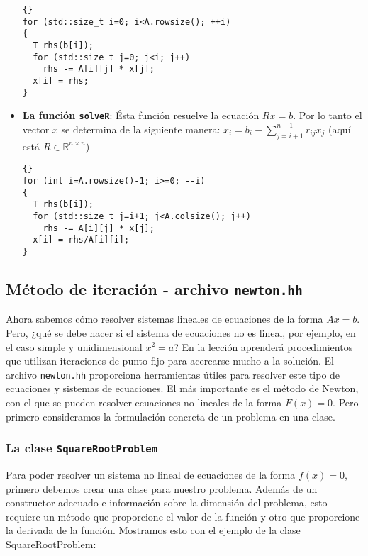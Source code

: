 \documentclass[a4paper,11pt]{article}
\theoremstyle{definition}
\begin{document}
\begin{itemize}
{\footnotesize{\begin{lstlisting}{}
for (std::size_t i=0; i<A.rowsize(); ++i)
{
  T rhs(b[i]);
  for (std::size_t j=0; j<i; j++)
    rhs -= A[i][j] * x[j];
  x[i] = rhs;
}
\end{lstlisting}}}

\item \textbf{La función \lstinline{solveR}}: 
  Ésta función resuelve la ecuación $Rx=b$. 
  Por lo tanto el vector $x$ se determina de la siguiente manera:
  $x_i= b_i - \sum_{j=i+1}^{n-1}r_{ij}x_j$ (aquí está
  $R \in \mathbb{R}^{n \times n}$)

{\footnotesize{\begin{lstlisting}{}
for (int i=A.rowsize()-1; i>=0; --i)
{
  T rhs(b[i]);
  for (std::size_t j=i+1; j<A.colsize(); j++)
    rhs -= A[i][j] * x[j];
  x[i] = rhs/A[i][i];
}
\end{lstlisting}}}

\end{itemize}



\subsection{Método de iteración - archivo \lstinline{newton.hh}}

  Ahora sabemos cómo resolver sistemas lineales de ecuaciones de la forma $Ax = b$. 
  Pero, ¿qué se debe hacer si el sistema de ecuaciones no es lineal, por ejemplo, 
  en el caso simple y unidimensional $x^2 = a$? En la lección aprenderá procedimientos 
  que utilizan iteraciones de punto fijo para acercarse mucho a la solución. 
  El archivo \lstinline{newton.hh} proporciona herramientas útiles para resolver este tipo de ecuaciones 
  y sistemas de ecuaciones.  El más importante es el método de Newton, con el que se pueden resolver ecuaciones 
  no lineales de la forma $F (x) = 0$. Pero primero consideramos la formulación concreta 
  de un problema en una clase.

\subsubsection{La clase  \lstinline{SquareRootProblem}}

  Para poder resolver un sistema no lineal de ecuaciones de la forma $f (x) = 0$, 
  primero debemos crear una clase para nuestro problema. Además de un constructor 
  adecuado e información sobre la dimensión del problema, esto requiere un método 
  que proporcione el valor de la función y otro que proporcione la derivada de la función. 
  Mostramos esto con el ejemplo de la clase SquareRootProblem:
\end{document}
